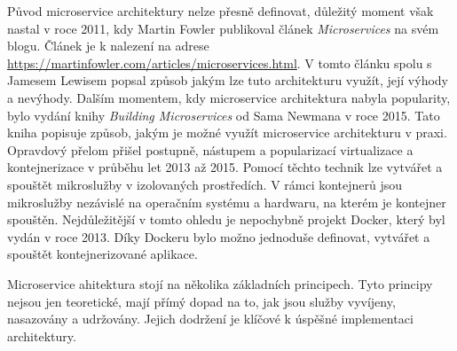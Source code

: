 
Původ microservice architektury nelze přesně definovat, důležitý moment však nastal v roce 2011, kdy Martin Fowler publikoval článek \textit{Microservices} na svém blogu. Článek je k nalezení na adrese \url{https://martinfowler.com/articles/microservices.html}. V tomto článku spolu s Jamesem Lewisem popsal způsob jakým lze tuto architekturu využít, její výhody a nevýhody. Dalším momentem, kdy microservice architektura nabyla popularity, bylo vydání knihy \textit{Building Microservices} od Sama Newmana v roce 2015. Tato kniha popisuje způsob, jakým je možné využít microservice architekturu v praxi. Opravdový přelom přišel postupně, nástupem a popularizací virtualizace a kontejnerizace v průběhu let 2013 až 2015. Pomocí těchto technik lze vytvářet a spouštět mikroslužby v izolovaných prostředích. V rámci kontejnerů jsou mikroslužby nezávislé na operačním systému a hardwaru, na kterém je kontejner spouštěn. Nejdůležitější v tomto ohledu je nepochybně projekt Docker, který byl vydán v roce 2013. \cite{dockerdocs} Díky Dockeru bylo možno jednoduše definovat, vytvářet a spouštět kontejnerizované aplikace. 


Microservice ahitektura stojí na několika základních principech. Tyto principy nejsou jen teoretické, mají přímý dopad na to, jak jsou služby vyvíjeny, nasazovány a udržovány. Jejich dodržení je klíčové k úspěšné implementaci architektury. \cite{Richardson2018}

